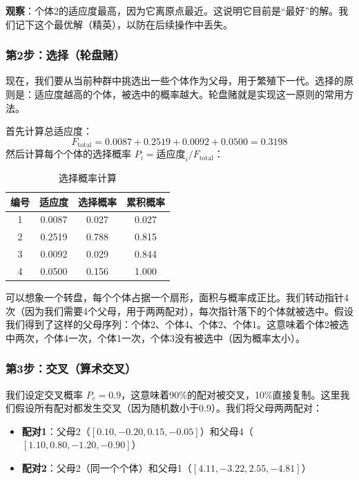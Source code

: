 \documentclass[lang=cn,zihao=-4,a4paper,fontset=windows]{beautybook}
\begin{document}
\textbf{观察}：个体2的适应度最高，因为它离原点最近。这说明它目前是“最好”的解。我们记下这个最优解（精英），以防在后续操作中丢失。

\subsubsection{第2步：选择（轮盘赌）}

现在，我们要从当前种群中挑选出一些个体作为父母，用于繁殖下一代。选择的原则是：适应度越高的个体，被选中的概率越大。轮盘赌就是实现这一原则的常用方法。

首先计算总适应度：
\[
F_{\text{total}} = 0.0087 + 0.2519 + 0.0092 + 0.0500 = 0.3198
\]
然后计算每个个体的选择概率 \(P_i = \text{适应度}_i / F_{\text{total}}\)：

\begin{table}[h]
\centering
\caption{选择概率计算}
\begin{tabular}{|c|c|c|c|}
\hline
编号 & 适应度 & 选择概率 & 累积概率 \\
\hline
1 & 0.0087 & 0.027 & 0.027 \\
2 & 0.2519 & 0.788 & 0.815 \\
3 & 0.0092 & 0.029 & 0.844 \\
4 & 0.0500 & 0.156 & 1.000 \\
\hline
\end{tabular}
\end{table}

可以想象一个转盘，每个个体占据一个扇形，面积与概率成正比。我们转动指针4次（因为我们需要4个父母，用于两两配对），每次指针落下的个体就被选中。假设我们得到了这样的父母序列：个体2、个体4、个体2、个体1。这意味着个体2被选中两次，个体4一次，个体1一次，个体3没有被选中（因为概率太小）。

\subsubsection{第3步：交叉（算术交叉）}

我们设定交叉概率 \(P_c = 0.9\)，这意味着90\%的配对被交叉，10\%直接复制。这里我们假设所有配对都发生交叉（因为随机数小于0.9）。我们将父母两两配对：

\begin{itemize}
    \item \textbf{配对1}：父母2（$[0.10,-0.20,0.15,-0.05]$）和父母4（$[1.10,0.80,-1.20,-0.90]$）
    \item \textbf{配对2}：父母2（同一个个体）和父母1（$[4.11,-3.22,2.55,-4.81]$）
\end{itemize}
\end{document}
